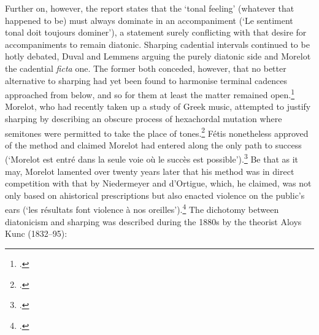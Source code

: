 \noindent
Further on, however, the report states that the `tonal feeling' (whatever that happened to be) must always dominate in an accompaniment (`Le sentiment tonal doit toujours dominer'), a statement surely conflicting with that desire for accompaniments to remain diatonic.
Sharping cadential intervals continued to be hotly debated, Duval and Lemmens arguing the purely diatonic side and Morelot the cadential \emph{ficta} one.
The former both conceded, however, that no better alternative to sharping had yet been found to harmonise terminal cadences approached from below, and so for them at least the matter remained open.\footcite[138--9, 141]{Vroyemusiquereligieusecongres1866}
%
Morelot, who had recently taken up a study of Greek music, attempted to justify sharping by describing an obscure process of hexachordal mutation where semitones were permitted to take the place of tones.\footcite[22]{MorelotElementsharmonieappliquee1861}
Fétis nonetheless approved of the method and claimed Morelot had entered along the only path to success (`Morelot est entré dans la seule voie où le succès est possible').\footcite[196]{FetisBiographieuniversellemusiciens1867}
Be that as it may, Morelot lamented over twenty years later that his method was in direct competition with that by Niedermeyer and d'Ortigue, which, he claimed, was not only based on ahistorical prescriptions but also enacted violence on the public's ears (`les résultats font violence à nos oreilles').\footcite[Stephen Morelot to Antonin Lhoumeau, 1 March 1878, printed in][3--6]{Lhoumeaualterationoudemiton1879}
%
%
The dichotomy between diatonicism and sharping was described during the 1880s by the theorist Aloys Kunc (1832--95):

